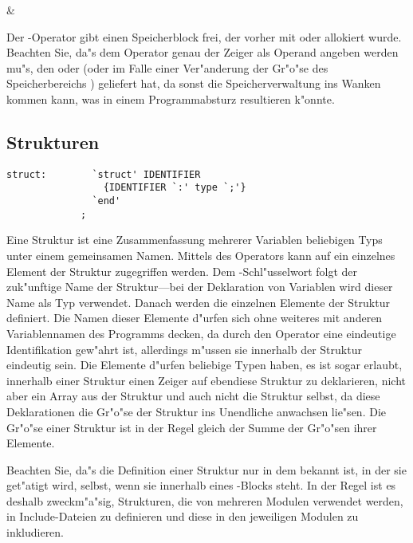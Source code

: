 \begin{operator}
  & \tvoid
\end{operator}

Der -Operator gibt einen Speicherblock frei, der
vorher mit  oder  allokiert wurde. Beachten
Sie, da"s dem Operator genau der Zeiger als Operand angeben
werden mu"s, den  oder  (oder im Falle einer
Ver"anderung der Gr"o"se des Speicherbereichs )
geliefert hat, da sonst die Speicherverwaltung ins Wanken kommen
kann, was in einem Programmabsturz resultieren k"onnte.

\subsection{Strukturen}

\begin{verbatim}
struct:        `struct' IDENTIFIER
                 {IDENTIFIER `:' type `;'}
               `end'
             ;
\end{verbatim}

Eine Struktur ist eine Zusammenfassung mehrerer Variablen
beliebigen Typs
unter einem gemeinsamen Namen. Mittels des
Operators \fu{->} kann auf ein einzelnes Element der Struktur
zugegriffen werden.
Dem -Schl"usselwort folgt der
zuk"unftige Name der Struktur---bei der Deklaration von Variablen
wird dieser Name als Typ verwendet. Danach werden die einzelnen
Elemente der Struktur definiert. Die Namen dieser Elemente d"urfen
sich ohne weiteres mit anderen Variablennamen des Programms
decken, da durch den Operator \fu{->} eine eindeutige
Identifikation gew"ahrt ist, allerdings m"ussen sie innerhalb der
Struktur eindeutig sein. Die Elemente d"urfen beliebige Typen
haben, es ist sogar erlaubt, innerhalb einer Struktur einen
Zeiger auf ebendiese Struktur zu deklarieren, nicht aber ein
Array aus der Struktur und auch nicht die Struktur selbst, da
diese Deklarationen die Gr"o"se der Struktur ins Unendliche
anwachsen lie"sen. Die Gr"o"se einer Struktur ist in der Regel
gleich der Summe der Gr"o"sen ihrer Elemente.

Beachten Sie, da"s die Definition einer Struktur nur in dem 
bekannt ist, in der sie get"atigt wird, selbst, wenn sie
innerhalb eines -Blocks steht. In der Regel ist es
deshalb zweckm"a"sig, Strukturen, die von mehreren Modulen
verwendet werden, in Include-Dateien
zu definieren und diese in den
jeweiligen Modulen zu inkludieren.

